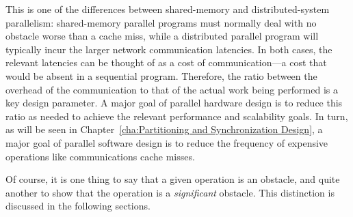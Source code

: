 This is one of the differences between shared-memory and distributed-system
parallelism: shared-memory parallel programs must normally deal with no
obstacle worse than a cache miss, while a distributed parallel program
will typically incur the larger network communication latencies.
In both cases, the relevant latencies can be thought of as a cost of
communication---a cost that would be absent in a sequential program.
Therefore, the ratio between the overhead of the communication to
that of the actual work being performed is a key design parameter.
A major goal of parallel hardware design is to reduce this ratio as
needed to achieve the relevant performance and scalability goals.
In turn, as will be seen in
Chapter~\ref{cha:Partitioning and Synchronization Design},
a major goal of parallel software design is to reduce the
frequency of expensive operations like communications cache misses.

Of course, it is one thing to say that a given operation is an obstacle,
and quite another to show that the operation is a \emph{significant}
obstacle.
This distinction is discussed in the following sections.
